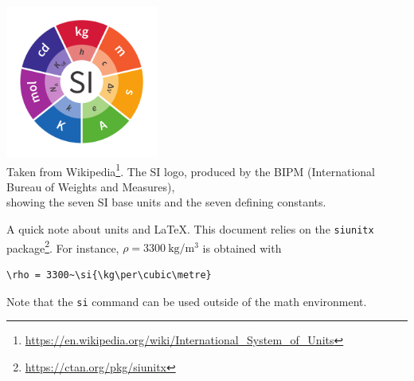 \begin{center}
\includegraphics[width=5cm]{images/siunits}\\
{\captionfont Taken from 
Wikipedia\footnote{\url{https://en.wikipedia.org/wiki/International_System_of_Units}}.
The SI logo, produced by the BIPM (International Bureau of Weights and Measures), \\
showing the seven SI base units and the seven defining constants.}
\end{center}

A quick note about units and \LaTeX. This document relies on the {\tt siunitx} 
package\footnote{\url{https://ctan.org/pkg/siunitx}}. For instance, 
$\rho = 3300~\si{\kg\per\cubic\metre}$ is obtained with 
\begin{verbatim}
\rho = 3300~\si{\kg\per\cubic\metre}
\end{verbatim}
Note that the {\tt si} command can be used outside of the math environment. 
